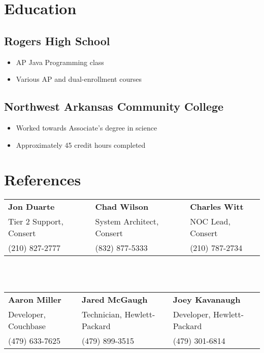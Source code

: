 \documentclass[10pt]{article}
\begin{document}
\section*{Education}
\subsection*{Rogers High School}
\begin{itemize}
    \item AP Java Programming class
    \item Various AP and dual-enrollment courses
\end{itemize}

\subsection*{Northwest Arkansas Community College}
\begin{itemize}
    \item Worked towards Associate's degree in science
    \item Approximately 45 credit hours completed
\end{itemize}

\section*{References}
\begin{tabular}{l l l}
\textbf{Jon Duarte} & \textbf{Chad Wilson} & \textbf{Charles Witt} \\
Tier 2 Support, Consert & System Architect, Consert & NOC Lead, Consert\\
(210) 827-2777 & (832) 877-5333 & (210) 787-2734\\
\end{tabular}
\\\\
\begin{tabular}{l l l}
\textbf{Aaron Miller} & \textbf{Jared McGaugh} & \textbf{Joey Kavanaugh} \\
Developer, Couchbase & Technician, Hewlett-Packard & Developer, Hewlett-Packard\\
(479) 633-7625 & (479) 899-3515 & (479) 301-6814\\
\end{tabular}
\end{document}
